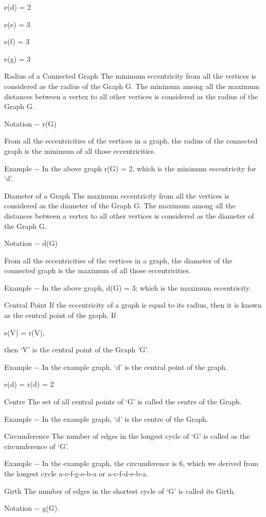 e(d) = 2

e(e) = 3

e(f) = 3

e(g) = 3

Radius of a Connected Graph
The minimum eccentricity from all the vertices is considered as the radius of the Graph G. The minimum among all the maximum distances between a vertex to all other vertices is considered as the radius of the Graph G.

Notation − r(G)

From all the eccentricities of the vertices in a graph, the radius of the connected graph is the minimum of all those eccentricities.

Example − In the above graph r(G) = 2, which is the minimum eccentricity for ‘d’.

Diameter of a Graph
The maximum eccentricity from all the vertices is considered as the diameter of the Graph G. The maximum among all the distances between a vertex to all other vertices is considered as the diameter of the Graph G.

Notation − d(G)

From all the eccentricities of the vertices in a graph, the diameter of the connected graph is the maximum of all those eccentricities.

Example − In the above graph, d(G) = 3; which is the maximum eccentricity.

Central Point
If the eccentricity of a graph is equal to its radius, then it is known as the central point of the graph. If

e(V) = r(V),

then ‘V’ is the central point of the Graph ’G’.

Example − In the example graph, ‘d’ is the central point of the graph.

e(d) = r(d) = 2

Centre
The set of all central points of ‘G’ is called the centre of the Graph.

Example − In the example graph, {‘d’} is the centre of the Graph.

Circumference
The number of edges in the longest cycle of ‘G’ is called as the circumference of ‘G’.

Example − In the example graph, the circumference is 6, which we derived from the longest cycle a-c-f-g-e-b-a or a-c-f-d-e-b-a.

Girth
The number of edges in the shortest cycle of ‘G’ is called its Girth.

Notation − g(G).

